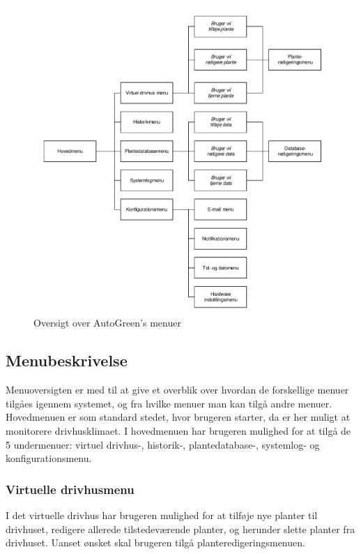 \begin{figure}[!h]
\centering 
\includegraphics[scale=0.7] {../fig/menu_oversigt.pdf}
\caption{Oversigt over AutoGreen's menuer}
\label{fig:QTMenu}
\end{figure}

\subsection{Menubeskrivelse}
Menuoversigten er med til at give et overblik over hvordan de forskellige menuer tilgåes igennem systemet, og fra hvilke menuer man kan tilgå andre menuer. Hovedmenuen er som standard stedet, hvor brugeren starter, da er her muligt at monitorere drivhusklimaet. I hovedmenuen har brugeren mulighed for at tilgå de 5 undermenuer: virtuel drivhus-, historik-, plantedatabase-, systemlog- og konfigurationsmenu.

\subsubsection{Virtuelle drivhusmenu}
I det virtuelle drivhus har brugeren mulighed for at tilføje nye planter til drivhuset, redigere allerede tilstedeværende planter, og herunder slette planter fra drivhuset. Uanset ønsket skal brugeren tilgå planteredigeringsmenuen.

